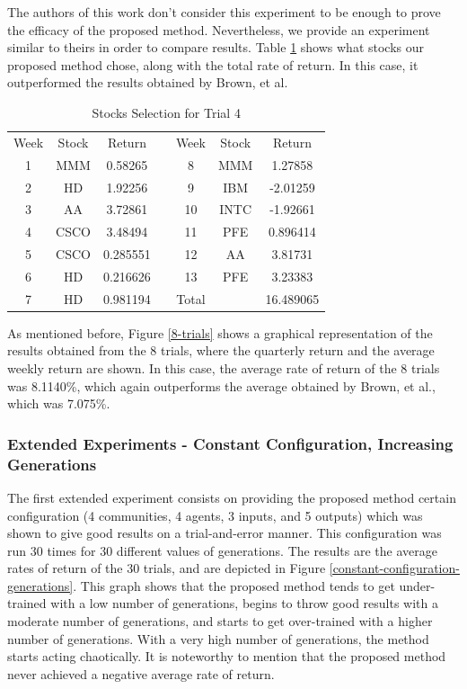 \documentclass[12pt,journal,compsoc]{IEEEtran}
\begin{document}
The authors of this work don't consider this experiment to be enough to prove the efficacy of the proposed method. Nevertheless, we provide an experiment similar to theirs in order to compare results. Table \ref{best-trial-table} shows what stocks our proposed method chose, along with the total rate of return. In this case, it outperformed the results obtained by Brown, et al.
    
\begin{table}
    \caption{{Stocks Selection for Trial 4}} 
    \label{best-trial-table}
    \begin{tabular}{ c c c c c c c }
        Week & Stock & Return &  & Week & Stock & Return \\ 
        1 & MMM & 0.58265 &  & 8 & MMM & 1.27858 \\ 
        2 & HD & 1.92256 &  & 9 & IBM & -2.01259 \\ 
        3 & AA & 3.72861 &  & 10 & INTC & -1.92661 \\ 
        4 & CSCO & 3.48494 &  & 11 & PFE & 0.896414 \\ 
        5 & CSCO & 0.285551 &  & 12 & AA & 3.81731 \\ 
        6 & HD & 0.216626 &  & 13 & PFE & 3.23383 \\ 
        7 & HD & 0.981194 &  & Total &  & 16.489065 \\ 
    \end{tabular}
\end{table}

As mentioned before, Figure \ref{8-trials} shows a graphical representation of the results obtained from the 8 trials, where the quarterly return and the average weekly return are shown. In this case, the average rate of return of the 8 trials was 8.1140\%, which again outperforms the average obtained by Brown, et al., which was 7.075\%.

\subsubsection{Extended Experiments - Constant Configuration, Increasing Generations}

The first extended experiment consists on providing the proposed method certain configuration (4 communities, 4 agents, 3 inputs, and 5 outputs) which was shown to give good results on a trial-and-error manner. This configuration was run 30 times for 30 different values of generations. The results are the average rates of return of the 30 trials, and are depicted in Figure \ref{constant-configuration-generations}. This graph shows that the proposed method tends to get under-trained with a low number of generations, begins to throw good results with a moderate number of generations, and starts to get over-trained with a higher number of generations. With a very high number of generations, the method starts acting chaotically. It is noteworthy to mention that the proposed method never achieved a negative average rate of return.
\end{document}
